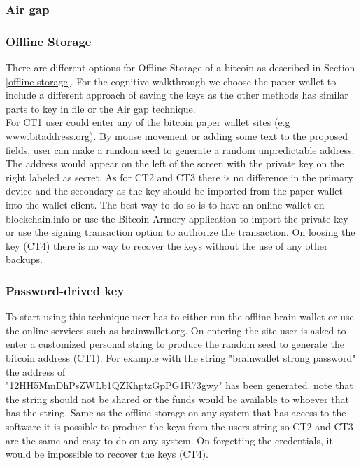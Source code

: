 \subsubsection{Air gap}
\label{sec:air gap}


\subsubsection{Offline Storage}
There are different options for Offline Storage of a bitcoin as described in Section \ref{offline storage}. For the cognitive walkthrough we choose the paper wallet to include a different approach of saving the keys as the other methods has similar parts to key in file or the Air gap technique.\\
For CT1 user could enter any of the bitcoin paper wallet sites (e.g www.bitaddress.org). By mouse movement or adding some text to the proposed fields, user can make a random seed to generate a random unpredictable address. The address would appear on the left of the screen with the private key on the right labeled as secret. As for CT2 and CT3 there is no difference in the primary device and the secondary as the key should be imported from the paper wallet into the wallet client. The best way to do so is to have an online wallet on blockchain.info or use the Bitcoin Armory application to import the private key or use the signing transaction option to authorize the transaction. On loosing the key (CT4) there is no way to recover the keys without the use of any other backups.

\subsubsection{Password-drived key}
To start using this technique user has to either run the offline brain wallet or use the online services such as brainwallet.org. On entering the site user is asked to enter a customized personal string to produce the random seed to generate the bitcoin address (CT1). For example with the string "brainwallet strong password" the address of \\ "12HH5MmDhPsZWLb1QZKhptzGpPG1R73gwy" has been generated. note that the string should not be shared or the funds would be available to whoever that has the string. Same as the offline storage on any system that has access to the software it is possible to produce the keys from the users string so CT2 and CT3 are the same and easy to do on any system. On forgetting the credentials, it would be impossible to recover the keys (CT4).


